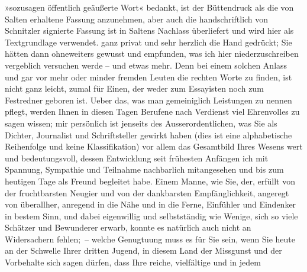 \begin{ledgroupsized}[t]{13cm}
{{{                     »sozusagen öffentlich geäußerte Wort« bedankt, ist der
                  Büttendruck als die von Salten erhaltene
                  Fassung anzunehmen, aber auch die handschriftlich von Schnitzler signierte Fassung ist in Saltens Nachlass überliefert und wird hier als
                  Textgrundlage verwendet.}}}\label{K_L02950-1h} ganz privat und sehr herzlich die Hand gedrückt;
               Sie hätten dann ohneweiters gewusst und empfunden, was ich hier niederzuschreiben
               vergeblich versuchen werde – und etwas mehr. Denn bei einem solchen Anlass und gar
               vor mehr oder minder fremden Leuten die rechten Worte zu finden, ist nicht ganz
               leicht, zumal für Einen, der weder zum Essayisten noch zum Festredner geboren
               ist.\pend
           \pstart
           Ueber das, was man gemeiniglich Leistungen zu nennen pflegt, werden Ihnen in diesen
               Tagen Berufene nach Verdienst viel Ehrenvolles zu sagen wissen; mir persönlich ist
                   jenseits 
               des Ausserordentlichen, was Sie als Dichter, Journalist und Schriftsteller gewirkt
               haben (dies ist eine alphabetische Reihenfolge und keine Klassifikation) {\pb}\introOben{}vor allem\introOben{} das Gesamtbild Ihres Wesens wert und
               bedeutungsvoll, dessen Entwicklung seit frühesten Anfängen ich mit Spannung,
               Sympathie und Teilnahme nachbarlich mitangesehen und bis zum heutigen Tage als Freund
               begleitet habe. Einem Manne, wie Sie, der, erfüllt von der fruchtbarsten Neugier und
               von der dankbarsten Empfänglichkeit, angeregt von überallher, anregend in die Nähe
               und in die Ferne, Einfühler und Eindenker in bestem Sinn, und dabei eigenwillig und
               selbstständig wie Wenige, sich so viele Schätzer und Bewunderer erwarb, konnte es
               natürlich auch nicht an Widersachern fehlen; – welche Genugtuung muss es für Sie sein,
               wenn Sie heute an der Schwelle Ihrer dritten Jugend, in diesem Land der Missgunst und
               der Vorbehalte sich sagen dürfen, dass Ihre reiche, vielfältige und in jedem

\end{ledgroupsized}
